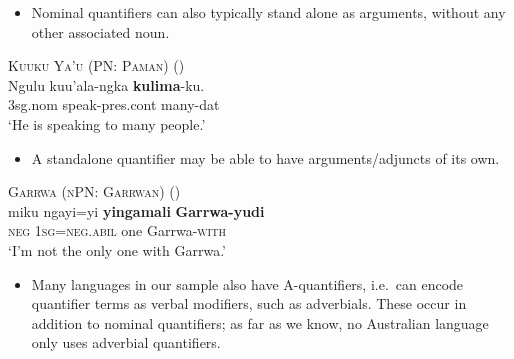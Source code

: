 \documentclass{article}
\begin{document}
\begin{itemize}
\item Nominal quantifiers can also typically stand alone as arguments, without any other associated noun. %
\end{itemize}

\begin{exe}
  \ex \textsc{Kuuku Ya'u (PN: Paman)} (\citealt[15]{thompson88})\\
  \gll Ngulu         kuu'ala-ngka           \textbf{kulima}-ku.\\
  3{\sc sg.nom} speak-{\sc pres.cont} many-{\sc dat}\\
  \glt `He is speaking to many people.'
\end{exe}

\begin{itemize}
\item A standalone quantifier may be able to have arguments/adjuncts of its own.
\end{itemize}
\begin{exe}
  \ex \textsc{Garrwa (nPN: Garrwan)} (\citealt[53]{mushin12})\\
  \gll miku ngayi=yi \textbf{yingamali} \textbf{Garrwa-yudi}\\
  \textsc{neg} 1\textsc{sg}=\textsc{neg.abil} one Garrwa-\textsc{with}\\
  \glt `I'm not the only one with Garrwa.'
\end{exe}

\begin{itemize}
\item Many languages in our sample also have A-quantifiers, i.e.\ can encode quantifier terms as verbal modifiers, such as adverbials. These occur in addition to nominal quantifiers; as far as we know, no Australian language only uses adverbial quantifiers.
\end{itemize}
\end{document}
